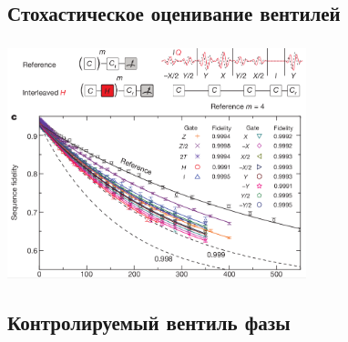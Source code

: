 \documentclass[aspectratio=169, 13pt, t]{beamer}
\begin{document}
\subsection{Стохастическое оценивание вентилей}
\begin{frame}[c]\frametitle{\secname}\framesubtitle{\subsecname}
\centering
\includegraphics[width=0.65\textwidth]{rb}

\end{frame}

\subsection{Контролируемый вентиль фазы}
\end{document}
